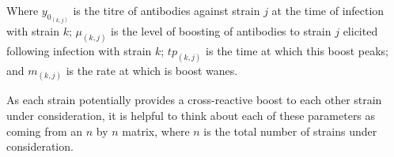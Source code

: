 \documentclass[a4paper,11pt,twoside]{article}
\begin{document}
Where $y_{0_{(k,j)}}$ is the titre of antibodies against strain $j$ at the time of infection with strain $k$; $\mu_{(k,j)}$ is the level of boosting of antibodies to strain $j$ elicited following infection with strain $k$; $tp_{(k,j)}$ is the time at which this boost peaks; and $m_{(k,j)}$ is the rate at which is boost wanes.

As each strain potentially provides a cross-reactive boost to each other strain under consideration, it is helpful to think about each of these parameters as coming from an $n$ by $n$ matrix, where $n$ is the total number of strains under consideration.
\end{document}
